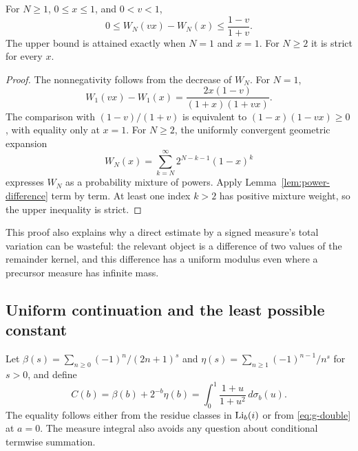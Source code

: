 \begin{theorem}\label{thm:kernel}
For $N\geq1$, $0\leq x\leq1$, and $0<v<1$,
\begin{equation}\label{eq:kernel-bound}
 0\leq W_N(vx)-W_N(x)\leq\frac{1-v}{1+v}.
\end{equation}
The upper bound is attained exactly when $N=1$ and $x=1$.
For $N\geq2$ it is strict for every $x$.
\end{theorem}
\begin{proof}
The nonnegativity follows from the decrease of $W_N$. For $N=1$,
\[
 W_1(vx)-W_1(x)=\frac{2x(1-v)}{(1+x)(1+vx)}.
\]
The comparison with $(1-v)/(1+v)$ is equivalent to
$(1-x)(1-vx)\geq0$, with equality only at $x=1$.
For $N\geq2$, the uniformly convergent geometric expansion
\begin{equation}\label{eq:W-mixture}
 W_N(x)=\sum_{k=N}^{\infty}2^{N-k-1}(1-x)^k
\end{equation}
expresses $W_N$ as a probability mixture of powers. Apply
Lemma~\ref{lem:power-difference} term by term. At least one index
$k>2$ has positive mixture weight, so the upper inequality is strict.
\end{proof}

This proof also explains why a direct estimate by a signed measure's
total variation can be wasteful: the relevant object is a difference
of two values of the remainder kernel, and this difference has a
uniform modulus even where a precursor measure has infinite mass.

\subsection{Uniform continuation and the least possible constant}

Let $\beta(s)=\sum_{n\geq0}(-1)^n/(2n+1)^s$ and
$\eta(s)=\sum_{n\geq1}(-1)^{n-1}/n^s$ for $s>0$, and define
\begin{equation}\label{eq:Cb}
 C(b)=\beta(b)+2^{-b}\eta(b)
     =\int_0^1\frac{1+u}{1+u^2}\,d\sigma_b(u).
\end{equation}
The equality follows either from the residue classes in $\operatorname{Li}_b(i)$
or from \eqref{eq:g-double} at $a=0$. The measure integral also
avoids any question about conditional termwise summation.

